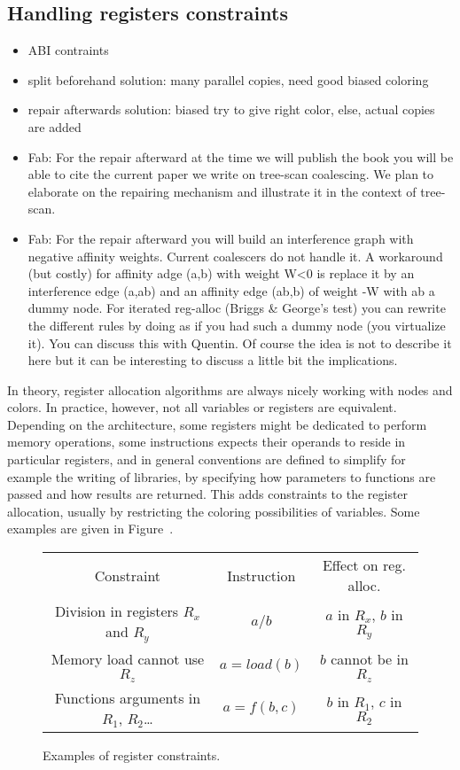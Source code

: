{\subsection{Handling registers constraints}
{\sl
\begin{itemize}
  \item ABI contraints
  \item split beforehand solution: many parallel copies, need good biased 
    coloring
  \item repair afterwards solution: biased try to give right color, else, 
    actual copies are added
  \item Fab: For the repair afterward at the time we will publish the book you 
    will be able to cite the current paper we write on tree-scan coalescing. We 
    plan to elaborate on the repairing mechanism and illustrate it in the 
    context of tree-scan.
  \item Fab: For the repair afterward you will build an interference graph with 
    negative affinity weights. Current coalescers do not handle it. A 
    workaround (but costly) for affinity adge (a,b) with weight W<0 is replace 
    it by an interference edge (a,ab) and an affinity edge (ab,b) of weight -W 
    with ab a dummy node. For iterated reg-alloc (Briggs \& George's test) you 
    can rewrite the different rules by doing as if you had such a dummy node 
    (you virtualize it). You can discuss this with Quentin. Of course the idea 
    is not to describe it here but it can be interesting to discuss a little 
    bit the implications.
\end{itemize}
}

In theory, register allocation algorithms are always nicely working with nodes 
and colors. In practice, however, not all variables or registers are 
equivalent. Depending on the architecture, some registers might be dedicated 
to perform memory operations, some instructions expects their operands to 
reside in particular registers, and in general conventions are defined to 
simplify for example the writing of libraries, by specifying how parameters to 
functions are passed and how results are returned. This adds constraints to the 
register allocation, usually by restricting the coloring possibilities of 
variables. Some examples are given in Figure~\label{fig:reg-constraints}.

\begin{figure}
  \begin{tabular}{ccc}
    Constraint  & Instruction & Effect on reg. alloc. \\
    Division in registers $R_x$ and $R_y$ & $a / b$ & $a$ in $R_x$, $b$ in $R_y$\\
    Memory load cannot use $R_z$ & $a = load(b)$ & $b$ cannot be in $R_z$\\
    Functions arguments in $R_1$, $R_2$\ldots & $a = f(b,c)$ & $b$ in $R_1$, 
    $c$ in $R_2$ \\
  \end{tabular}
  \caption{Examples of register constraints.}
  \label{fig:reg-constraints}
\end{figure}


}
